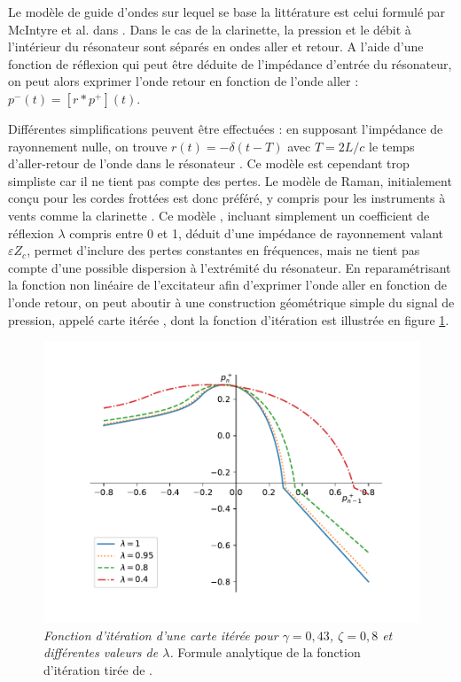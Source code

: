 Le modèle de guide d'ondes sur lequel se base la littérature est celui formulé par McIntyre et al. dans \cite{mcintyre_oscillations_1983}. Dans le cas de la clarinette, la pression et le débit à l'intérieur du résonateur sont séparés en ondes aller et retour. 
A l'aide d'une fonction de réflexion qui peut être déduite de l'impédance d'entrée du résonateur, on peut alors exprimer l'onde retour en fonction de l'onde aller : $p^-(t) = [r * p^+] (t)$.

Différentes simplifications peuvent être effectuées : en supposant l'impédance de rayonnement nulle, on trouve $r(t) = - \delta(t-T)$ avec $T = 2L/c$ le temps d'aller-retour de l'onde dans le résonateur \cite{taillardIteratedMapsClarinetlike2010}. Ce modèle est cependant trop simpliste car il ne tient pas compte des pertes. Le modèle de Raman, initialement conçu pour les cordes frottées \cite{raman1918mechanical} est donc préféré, y compris pour les instruments à vents comme la clarinette \cite{maganza_bifurcations_1986}. Ce modèle
, incluant simplement un coefficient de réflexion $\lambda$ compris entre 0 et 1,
déduit d'une impédance de rayonnement valant $\varepsilon Z_c$, 
permet d'inclure des pertes constantes en fréquences, mais ne tient pas compte d'une possible dispersion à l'extrémité du résonateur. En reparamétrisant la fonction non linéaire de l'excitateur afin d'exprimer l'onde aller en fonction de l'onde retour, on peut aboutir à une construction géométrique simple du signal de pression, appelé carte itérée \cite{taillardIteratedMapsClarinetlike2010}, dont la fonction d'itération est illustrée en figure \ref{fig:iteration-func}.

\begin{figure}
    \centering
    \includegraphics[width=1\linewidth]{img/iteration_function.pdf}
    \caption{\textit{Fonction d'itération d'une carte itérée pour $\gamma = 0,43$, $\zeta=0,8$ et différentes valeurs de $\lambda$.} Formule analytique de la fonction d'itération tirée de
    \cite{taillardIteratedMapsClarinetlike2010}.}
    \label{fig:iteration-func}
\end{figure}

